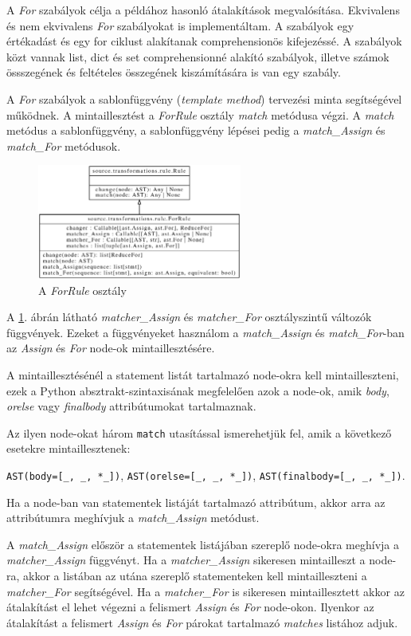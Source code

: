 A \emph{For} szabályok célja a példához hasonló átalakítások megvalósítása.
Ekvivalens és nem ekvivalens \emph{For} szabályokat is implementáltam.
A szabályok egy értékadást és egy for ciklust alakítanak comprehensionös kifejezéssé.
A szabályok közt vannak list, dict és set comprehensionné alakító szabályok,
illetve számok össszegének és feltételes összegének kiszámítására is van egy szabály.

A \emph{For} szabályok a sablonfüggvény (\emph{template method})
tervezési minta segítségével működnek.
A mintaillesztést a \emph{ForRule} osztály \emph{match} metódusa végzi.
A \emph{match} metódus a sablonfüggvény,
a sablonfüggvény lépései pedig
a \emph{match\_Assign} és \emph{match\_For} metódusok.

\begin{figure}[H]
	\centering
	\includegraphics[width=0.6\textwidth]{images/uml/ForRule.eps}
	\caption{\label{fig:ForRule}A \emph{ForRule} osztály}
\end{figure}

A \ref{fig:ForRule}. ábrán látható
\emph{matcher\_Assign} és \emph{matcher\_For} osztályszintű változók függvények.
Ezeket a függvényeket használom a
\emph{match\_Assign} és \emph{match\_For}-ban az \emph{Assign} és \emph{For}
node-ok mintaillesztésére.

A mintaillesztésénél a statement listát tartalmazó node-okra kell mintailleszteni,
ezek a Python absztrakt-szintaxisának megfelelően azok a node-ok,
amik \emph{body}, \emph{orelse} vagy \emph{finalbody} attribútumokat tartalmaznak.

Az ilyen node-okat három \texttt{match} utasítással ismerehetjük fel,
amik a következő esetekre mintaillesztenek:

\lstinline{AST(body=[_, _, *_])},
\lstinline{AST(orelse=[_, _, *_])},
\lstinline{AST(finalbody=[_, _, *_])}.

Ha a node-ban van statementek listáját tartalmazó attribútum,
akkor arra az attribútumra meghívjuk a \emph{match\_Assign} metódust.

A \emph{match\_Assign} először a statementek listájában szereplő
node-okra meghívja a \emph{matcher\_Assign} függvényt.
Ha a \emph{matcher\_Assign} sikeresen mintailleszt a node-ra,
akkor a listában az utána szereplő
statementeken kell mintailleszteni a \emph{matcher\_For} segítségével.
Ha a \emph{matcher\_For} is sikeresen mintaillesztett akkor az átalakítást
el lehet végezni
a felismert \emph{Assign} és \emph{For} node-okon.
Ilyenkor az átalakítást a felismert \emph{Assign} és \emph{For} párokat tartalmazó
\emph{matches} listához adjuk.

